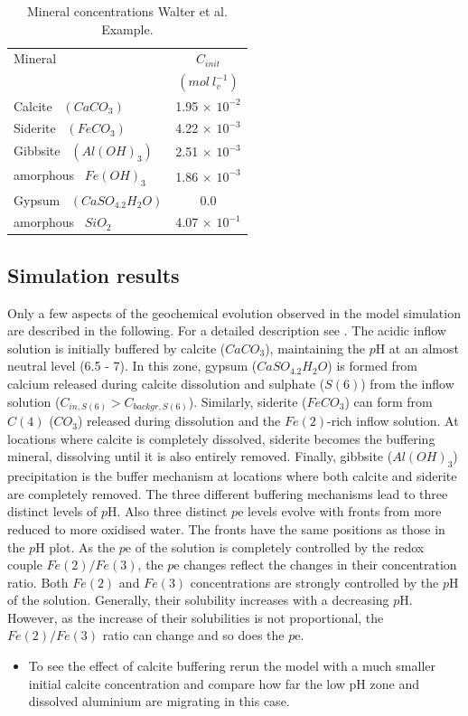 \begin{table}
\caption{Mineral concentrations Walter et al. Example.}
\begin{center}
\begin{tabular}{ l c }
\hline
Mineral        & $C_{init}$  \\
                  & $(mol\ l^{-1}_{v})$  \\ \hline
Calcite \   $(CaCO_3)  $  & 1.95 $\times$ $10^{-2}$  \\
Siderite  \ $(FeCO_3)  $  & 4.22 $\times$ $10^{-3}$     \\
Gibbsite \ $(Al(OH)_3) $  & 2.51 $\times$ $10^{-3}$     \\
amorphous \ $Fe(OH)_3  $  & 1.86 $\times$ $10^{-3}$      \\
Gypsum \ $(CaSO_4.2H_2O) $ & 0.0                  \\
amorphous  \ $SiO_2    $  & 4.07 $\times$ $10^{-1}$  \\ \hline
\end{tabular}
\label{ex3_cmin}
\end{center}
\end{table}


\subsection[Simulation results]{Simulation results}

\par Only a few aspects of the geochemical evolution
observed in the model simulation are described
in the following. For a detailed description see \cite{walt94a}.
The acidic inflow solution is initially buffered by 
calcite ($CaCO_3$), maintaining the $p$H
at an almost neutral level (6.5 - 7). In this zone, gypsum
($CaSO_4.2H_2O$) is formed from calcium released during calcite
dissolution and sulphate ($S(6)$) from the inflow solution
($C_{in,S(6)} > C_{backgr,S(6)}$). Similarly, siderite ($FeCO_3$)
can form from $C(4)$ ($CO_3$) released during dissolution and the
$Fe(2)$-rich inflow solution. At locations where calcite is
completely dissolved, siderite becomes the buffering mineral,
dissolving until it is also entirely removed. Finally, gibbsite
($Al(OH)_3$) precipitation is the buffer mechanism at locations
where both calcite and siderite are completely removed. The three
different buffering mechanisms lead to three distinct levels of
$p$H. Also three distinct
$p$e levels evolve with fronts from more reduced to more oxidised
water. The fronts have the same positions as those in the $p$H
plot. As the $p$e of the solution is completely controlled by the
redox couple $Fe(2)/Fe(3)$, the $p$e changes reflect the changes
in their concentration ratio. Both $Fe(2)$ and $Fe(3)$
concentrations are strongly controlled by the $p$H of the
solution. Generally, their solubility increases with a decreasing
$p$H. However, as the increase of their solubilities is not
proportional, the $Fe(2)/Fe(3)$ ratio can change and so does the
$p$e.

\begin{itemize}

\item To see the effect of calcite buffering rerun the model with a much 
smaller initial calcite concentration and compare how far the 
low pH zone and dissolved aluminium are migrating in this case.

\end{itemize}

